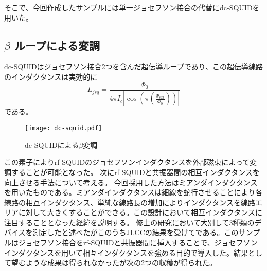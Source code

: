 
        そこで、今回作成したサンプルには単一ジョセフソン接合の代替にdc-SQUIDを用いた。
        \subsection{$\beta$ ループによる変調}
        dc-SQUIDはジョセフソン接合2つを含んだ超伝導ループであり、この超伝導線路のインダクタンスは実効的に
        \begin{equation*}
            L_{jsq} = \frac{\Phi_0}{4\pi I_c|\cos(\pi(\frac{\Phi_{ext}}{\Phi_0}))|}
        \end{equation*}
        である。
        \begin{figure}[H]
            \centering
            \texttt{[image: dc-squid.pdf]}
            \caption{dc-SQUIDによる$\beta$変調}
        \end{figure}
        この素子によりrf-SQUIDのジョセフソンインダクタンスを外部磁束によって変調することが可能となった。
        次にrf-SQUIDと共振器間の相互インダクタンスを向上させる手法について考える。
        今回採用した方法はミアンダインダクタンスを用いたものである。ミアンダインダクタンスは細線を蛇行させることにより各線路の相互インダクタンス、単純な線路長の増加によりインダクタンスを線路エリアに対して大きくすることができる。この設計において相互インダクタンスに注目することとなった経緯を説明する。
        修士の研究において大別して3種類のデバイスを測定したと述べたがこのうちJLCCの結果を受けてである。このサンプルはジョセフソン接合をrf-SQUIDと共振器間に挿入することで、ジョセフソンインダクタンスを用いて相互インダクタンスを強める目的で導入した。結果として望むような成果は得られなかったが次の2つの収穫が得られた。

